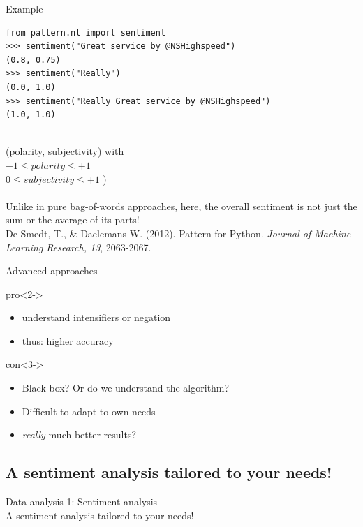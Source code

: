 \documentclass{beamer}
\begin{document}
\begin{frame}[fragile]{Example}
\begin{lstlisting}
from pattern.nl import sentiment
>>> sentiment("Great service by @NSHighspeed")
(0.8, 0.75)
>>> sentiment("Really")
(0.0, 1.0)
>>> sentiment("Really Great service by @NSHighspeed")
(1.0, 1.0)
\end{lstlisting}
~\\
\footnotesize{(polarity, subjectivity) with \\
 $-1 \leq polarity \leq +1$\\
 $0 \leq subjectivity \leq +1$ )\\} ~ \\
Unlike in pure bag-of-words approaches, here, the overall sentiment is not just the sum or the average of its parts! \\
\tiny{De Smedt, T., \& Daelemans W. (2012).  Pattern for Python. \emph{Journal of Machine Learning Research, 13}, 2063-2067.}
\end{frame}




\begin{frame}{Advanced approaches}
\begin{block}{pro}<2->
\begin{itemize}
\item understand intensifiers or negation
\item thus: higher accuracy
\end{itemize}
\end{block}
\begin{block}{con}<3->
\begin{itemize}
\item Black box? Or do we understand the algorithm?
\item Difficult to adapt to own needs
\item \emph{really} much better results?
\end{itemize}
\end{block}
\end{frame}



\subsection{A sentiment analysis tailored to your needs!}
\begin{frame}
Data analysis 1: Sentiment analysis\\
A sentiment analysis tailored to your needs!
\end{frame}
\end{document}
